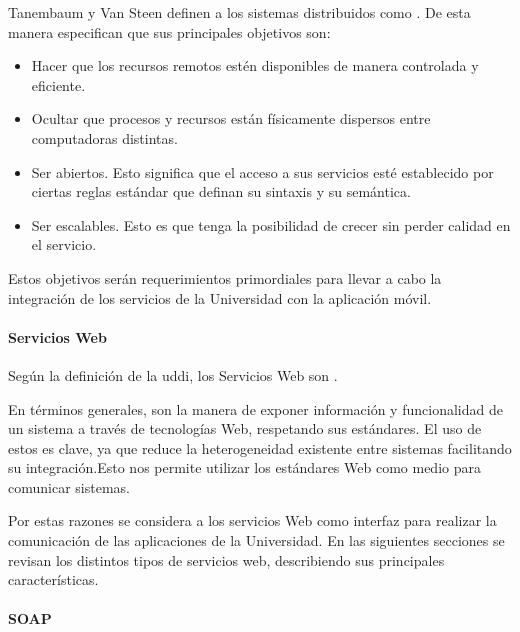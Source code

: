 Tanembaum y Van Steen definen a los sistemas distribuidos como \cite[p.~2]{tanenbaum2007distributed}. De esta manera especifican que sus principales objetivos son:

\begin{itemize}
\item Hacer que los recursos remotos estén disponibles de manera controlada y eficiente.
\item Ocultar que procesos y recursos están físicamente dispersos entre computadoras distintas.
\item Ser abiertos. Esto significa que el acceso a sus servicios esté establecido por ciertas reglas estándar que definan su sintaxis y su semántica.
\item Ser escalables. Esto es que tenga la posibilidad de crecer sin perder calidad en el servicio.
\end{itemize}

Estos objetivos serán requerimientos primordiales para llevar a cabo la integración de los servicios de la Universidad con la aplicación móvil.

\paragraph{Servicios Web}
\label{servicios_web}

Según la definición de la \gls{uddi}, los Servicios Web son \cite{uddi2001uddi}. 

En términos generales, son la manera de exponer información y funcionalidad de un sistema a través de tecnologías Web, respetando sus estándares. El uso de estos es clave, ya que reduce la heterogeneidad existente entre sistemas facilitando su integración\cite{alonso2004web}.Esto nos permite utilizar los estándares Web como medio para comunicar sistemas. 

Por estas razones se considera a los servicios Web como interfaz para realizar la comunicación de las aplicaciones de la Universidad.
En las siguientes secciones se revisan los distintos tipos de servicios web, describiendo sus principales características.

\paragraph{SOAP}
\label{soap}

